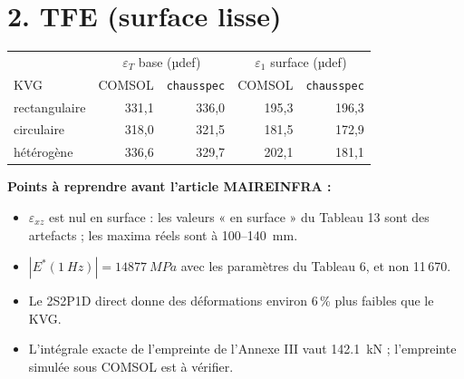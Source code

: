 \documentclass[11pt,a4paper]{article}
\renewcommand{\epsilon}{\varepsilon}
\begin{document}
\section*{2. TFE (surface lisse)}
\begin{center}\small
\begin{tabular}{lrrrr}
\toprule
& \multicolumn{2}{c}{$\epsilon_T$ base (µdef)} & \multicolumn{2}{c}{$\epsilon_1$ surface (µdef)}\\
KVG & COMSOL & \texttt{chausspec} & COMSOL & \texttt{chausspec}\\
\midrule
rectangulaire & 331,1 & 336,0 & 195,3 & 196,3\\
circulaire & 318,0 & 321,5 & 181,5 & 172,9\\
hétérogène & 336,6 & 329,7 & 202,1 & 181,1\\
\bottomrule
\end{tabular}
\end{center}
\textbf{Points à reprendre avant l'article MAIREINFRA :}
\begin{itemize}[nosep]
\item $\epsilon_{xz}$ est nul en surface : les valeurs « en surface » du Tableau 13 sont des artefacts ; les maxima réels sont à 100--\SI{140}{mm}.
\item $|E^*(\SI{1}{Hz})|=\SI{14877}{MPa}$ avec les paramètres du Tableau 6, et non 11\,670.
\item Le 2S2P1D direct donne des déformations environ 6\,\% plus faibles que le KVG.
\item L'intégrale exacte de l'empreinte de l'Annexe III vaut \SI{142.1}{kN} ; l'empreinte simulée sous COMSOL est à vérifier.
\end{itemize}
\end{document}
